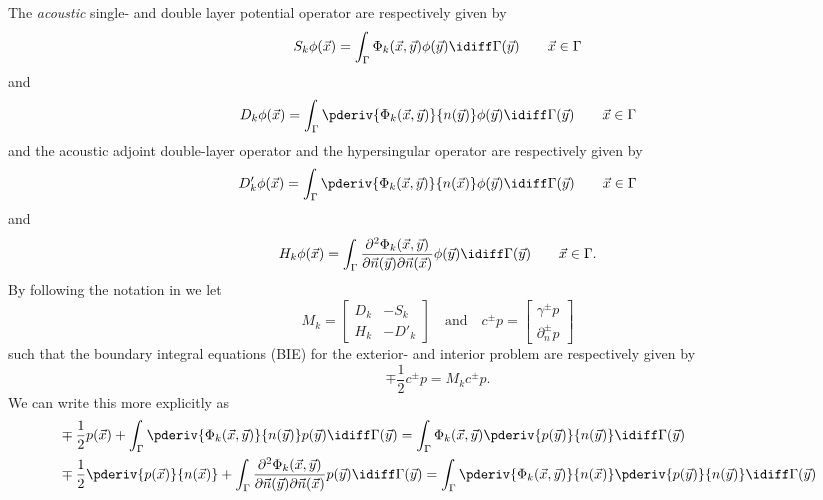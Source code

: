 The \textit{acoustic} single- and double layer potential operator are respectively given by
\begin{equation*}
	S_k \phi(\vec{x}) = \int_\Gamma \Phi_k(\vec{x},\vec{y}) \phi(\vec{y}) \idiff\Gamma(\vec{y})\qquad \vec{x}\in\Gamma
\end{equation*}
and
\begin{equation*}
	D_k \phi(\vec{x}) = \int_\Gamma \pderiv{\Phi_k(\vec{x},\vec{y})}{n(\vec{y})} \phi(\vec{y}) \idiff\Gamma(\vec{y})\qquad \vec{x}\in\Gamma
\end{equation*}
and the  acoustic adjoint double-layer operator and the hypersingular operator are respectively given by
\begin{equation*}
	D'_k \phi(\vec{x}) = \int_\Gamma \pderiv{\Phi_k(\vec{x},\vec{y})}{n(\vec{x})} \phi(\vec{y}) \idiff\Gamma(\vec{y})\qquad \vec{x}\in\Gamma
\end{equation*}
and
\begin{equation*}
	H_k \phi(\vec{x}) = \int_\Gamma \frac{\partial^2\Phi_k(\vec{x},\vec{y})}{\partial\vec{n}(\vec{y})\partial\vec{n}(\vec{x})} \phi(\vec{y}) \idiff\Gamma(\vec{y})\qquad \vec{x}\in\Gamma.
\end{equation*}
By following the notation in \cite[p. 117]{Chandler_Wilde2012nab} we let
\begin{equation*}
	M_k = \begin{bmatrix}
		D_k & -S_k\\
		H_k & -D'_k
	\end{bmatrix}\quad\text{and}\quad c^\pm p = \begin{bmatrix}
		\gamma^\pm p\\
		\partial_n^\pm p
	\end{bmatrix}
\end{equation*}
such that the boundary integral equations (BIE) for the exterior- and interior problem are respectively given by
\begin{equation*}
	\mp\frac{1}{2}c^\pm p = M_k c^\pm p.
\end{equation*}
We can write this more explicitly as
\begin{align*}
	&\mp \frac{1}{2}p(\vec{x}) + \int_\Gamma \pderiv{\Phi_k(\vec{x},\vec{y})}{n(\vec{y})} p(\vec{y}) \idiff\Gamma(\vec{y}) = \int_\Gamma \Phi_k(\vec{x},\vec{y}) \pderiv{p(\vec{y})}{n(\vec{y})} \idiff\Gamma(\vec{y})\\
	&\mp \frac{1}{2}\pderiv{p(\vec{x})}{n(\vec{x})} +  \int_\Gamma \frac{\partial^2\Phi_k(\vec{x},\vec{y})}{\partial\vec{n}(\vec{y})\partial\vec{n}(\vec{x})} p(\vec{y}) \idiff\Gamma(\vec{y}) = \int_\Gamma \pderiv{\Phi_k(\vec{x},\vec{y})}{n(\vec{x})} \pderiv{p(\vec{y})}{n(\vec{y})} \idiff\Gamma(\vec{y})
\end{align*}
